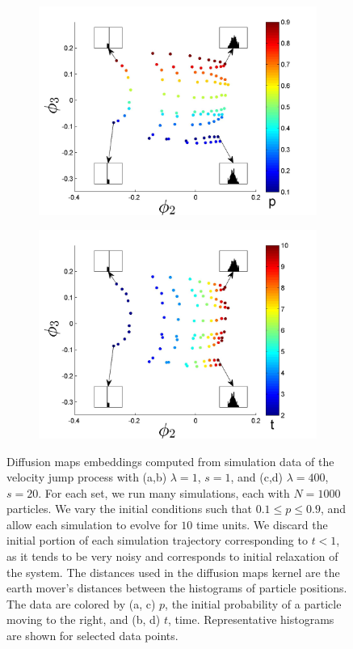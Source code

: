 \documentclass[prl, reprint, final, showkeys]{revtex4-1}
\begin{document}
\begin{figure}[t!]
\begin{subfigure}{\figwidth}
\includegraphics[width=\textwidth]{EMD_withhist_p_400}
\caption{}
\label{subfig:large_lambda_p}
\end{subfigure}
\begin{subfigure}{\figwidth}
\includegraphics[width=\textwidth]{EMD_withhist_t_400}
\caption{}
\label{subfig:large_lambda_t}
\end{subfigure}
\caption{Diffusion maps embeddings computed from simulation data of the velocity jump process with (a,b) $\lambda=1$, $s=1$, and (c,d) $\lambda=400$, $s=20$.  For each set, we run many simulations, each with $N=1000$ particles.
%
We vary the initial conditions such that $0.1 \le p  \le 0.9$, and allow each simulation to evolve for $10$ time units.
%
We discard the initial portion of each simulation trajectory corresponding to $t < 1$, as it tends to be very noisy and corresponds to initial relaxation of the system.
%
The distances used in the diffusion maps kernel are the earth mover's distances between the histograms of particle positions. The data are colored by (a, c) $p$, the initial probability of a particle moving to the right, and (b, d) $t$, time. Representative histograms are shown for selected data points.}
\label{fig:dmaps_embed_emd}
\end{figure}
\end{document}
